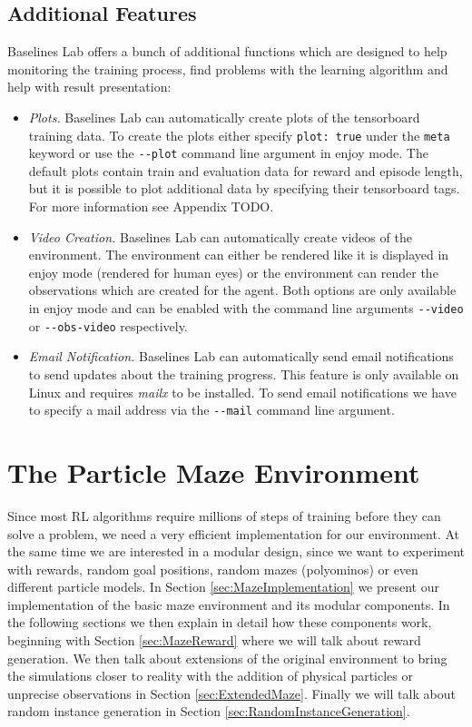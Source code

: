 \subsection{Additional Features} \label{sec:blAdvanced}
Baselines Lab offers a bunch of additional functions which are designed to help monitoring the training process, find problems with the learning algorithm and help with result presentation:

\begin{itemize}
    \item \textit{Plots.} Baselines Lab can automatically create plots of the tensorboard training data. To create the plots either specify \texttt{plot: true} under the \texttt{meta} keyword or use the \texttt{-{}-plot} command line argument in enjoy mode. The default plots contain train and evaluation data for reward and episode length, but it is possible to plot additional data by specifying their tensorboard tags. For more information see Appendix TODO.
    \item \textit{Video Creation.} Baselines Lab can automatically create videos of  the environment. The environment can either be rendered like it is displayed in enjoy mode (rendered for human eyes) or the environment can render the observations which are created for the agent. Both options are only available in enjoy mode and can be enabled with the command line arguments \texttt{-{}-video} or \texttt{-{}-obs-video} respectively.
    \item \textit{Email Notification.} Baselines Lab can automatically send email notifications to send updates about the training progress. This feature is only available on Linux and requires \textit{mailx} to be installed. To send email notifications we have to specify a mail address via the \texttt{-{}-mail} command line argument. 
\end{itemize}

\section{The Particle Maze Environment} \label{sec:MazeEnvironment}
Since most RL algorithms require millions of steps of training before they can solve a problem, we need a very efficient implementation for our environment. At the same time we are interested in a modular design, since we want to experiment with rewards, random goal positions, random mazes (polyominos) or even different particle models. In Section \ref{sec:MazeImplementation} we present our implementation of the basic maze environment and its modular components. In the following sections we then explain in detail how these components work, beginning with Section \ref{sec:MazeReward} where we will talk about reward generation. We then talk about extensions of the original environment to bring the simulations closer to reality with the addition of physical particles or unprecise observations in Section \ref{sec:ExtendedMaze}. Finally we will talk about random instance generation in Section \ref{sec:RandomInstanceGeneration}.

